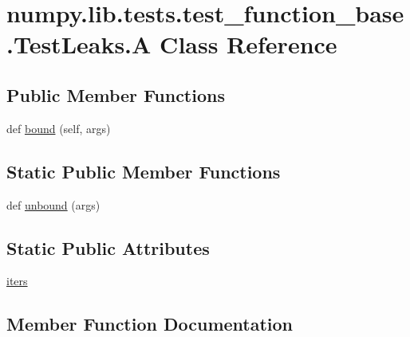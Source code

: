 \hypertarget{classnumpy_1_1lib_1_1tests_1_1test__function__base_1_1TestLeaks_1_1A}{}\section{numpy.\+lib.\+tests.\+test\+\_\+function\+\_\+base.\+Test\+Leaks.\+A Class Reference}
\label{classnumpy_1_1lib_1_1tests_1_1test__function__base_1_1TestLeaks_1_1A}
\subsection*{Public Member Functions}
\begin{DoxyCompactItemize}
\item 
def \hyperlink{classnumpy_1_1lib_1_1tests_1_1test__function__base_1_1TestLeaks_1_1A_a11216f4b177e46e3defa316fdf4733e6}{bound} (self, args)
\end{DoxyCompactItemize}
\subsection*{Static Public Member Functions}
\begin{DoxyCompactItemize}
\item 
def \hyperlink{classnumpy_1_1lib_1_1tests_1_1test__function__base_1_1TestLeaks_1_1A_a95468b17d8183894b4e14e71cc934478}{unbound} (args)
\end{DoxyCompactItemize}
\subsection*{Static Public Attributes}
\begin{DoxyCompactItemize}
\item 
\hyperlink{classnumpy_1_1lib_1_1tests_1_1test__function__base_1_1TestLeaks_1_1A_a9c0b3f14f6f2ceec569bec6053522bd1}{iters}
\end{DoxyCompactItemize}


\subsection{Member Function Documentation}
\mbox{\label{classnumpy_1_1lib_1_1tests_1_1test__function__base_1_1TestLeaks_1_1A_a11216f4b177e46e3defa316fdf4733e6}} 
